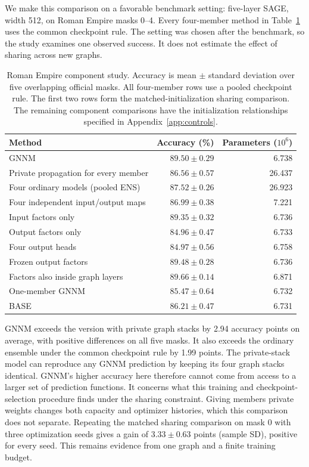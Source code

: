 \documentclass{article}
\begin{document}
We make this comparison on a favorable benchmark setting: five-layer SAGE, width 512, on Roman Empire masks 0--4. Every four-member method in Table~\ref{tab:component-main} uses the common checkpoint rule. The setting was chosen after the benchmark, so the study examines one observed success. It does not estimate the effect of sharing across new graphs.

\begin{table}[t]
\centering\small
\setlength{\tabcolsep}{5pt}
\caption{Roman Empire component study. Accuracy is mean $\pm$ standard deviation over five overlapping official masks. All four-member rows use a pooled checkpoint rule. The first two rows form the matched-initialization sharing comparison. The remaining component comparisons have the initialization relationships specified in Appendix~\ref{app:controls}.}
\label{tab:component-main}
\begin{tabular}{lrr}
\toprule
Method & Accuracy (\%) & Parameters ($10^6$)\\
\midrule
GNNM & $89.50\pm0.29$ & 6.738\\
Private propagation for every member & $86.56\pm0.57$ & 26.437\\
\midrule
Four ordinary models (pooled ENS) & $87.52\pm0.26$ & 26.923\\
Four independent input/output maps & $86.99\pm0.38$ & 7.221\\
Input factors only & $89.35\pm0.32$ & 6.736\\
Output factors only & $84.96\pm0.47$ & 6.733\\
Four output heads & $84.97\pm0.56$ & 6.758\\
Frozen output factors & $89.48\pm0.28$ & 6.736\\
Factors also inside graph layers & $89.66\pm0.14$ & 6.871\\
One-member GNNM & $85.47\pm0.64$ & 6.732\\
BASE & $86.21\pm0.47$ & 6.731\\
\bottomrule
\end{tabular}
\end{table}

GNNM exceeds the version with private graph stacks by 2.94 accuracy points on average, with positive differences on all five masks. It also exceeds the ordinary ensemble under the common checkpoint rule by 1.99 points. The private-stack model can reproduce any GNNM prediction by keeping its four graph stacks identical. GNNM's higher accuracy here therefore cannot come from access to a larger set of prediction functions. It concerns what this training and checkpoint-selection procedure finds under the sharing constraint. Giving members private weights changes both capacity and optimizer histories, which this comparison does not separate. Repeating the matched sharing comparison on mask 0 with three optimization seeds gives a gain of $3.33\pm0.63$ points (sample SD), positive for every seed. This remains evidence from one graph and a finite training budget.
\end{document}

